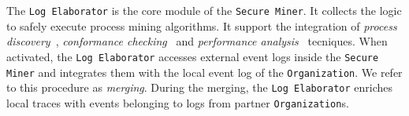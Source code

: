 The \texttt{Log Elaborator} is the core module of the \texttt{Secure Miner}. It collects the logic to safely execute process mining algorithms. It support the integration of \textit{process discovery}~\cite{citation}, \textit{conformance checking}~\cite{citation} and \textit{performance analysis}~\cite{ciation} tecniques. When activated, the \texttt{Log Elaborator} %
accesses external event logs inside the \texttt{Secure Miner} and integrates them with the local event log of the \texttt{Organization}. We refer to this procedure as \textit{merging}. %
During the merging, the \texttt{Log Elaborator} enriches local traces with events belonging to logs from partner \texttt{Organization}s.

